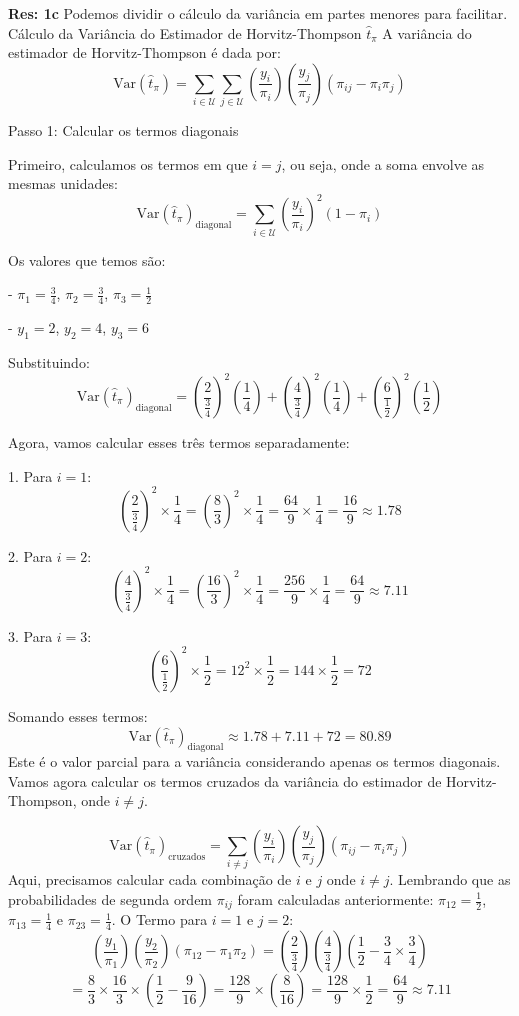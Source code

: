 \documentclass[a4paper,11pt,oneside,twocolumn]{Config/milktest}
\begin{document}
\medskip
{\scriptsize

\textbf{Res:  1c} Podemos dividir o cálculo da variância em partes menores para facilitar. Cálculo da Variância do Estimador de Horvitz-Thompson \(\hat{t}_\pi\) A variância do estimador de Horvitz-Thompson é dada por:
\[
\text{Var}(\hat{t}_\pi) = \sum_{i \in \mathcal{U}} \sum_{j \in \mathcal{U}} \left(\frac{y_i}{\pi_i}\right) \left(\frac{y_j}{\pi_j}\right) (\pi_{ij} - \pi_i \pi_j)
\]

Passo 1: Calcular os termos diagonais

Primeiro, calculamos os termos em que \(i = j\), ou seja, onde a soma envolve as mesmas unidades:
\[
\text{Var}(\hat{t}_\pi)_{\text{diagonal}} = \sum_{i \in \mathcal{U}} \left(\frac{y_i}{\pi_i}\right)^2 (1 - \pi_i)
\]

Os valores que temos são:

- \(\pi_1 = \frac{3}{4}\), \(\pi_2 = \frac{3}{4}\), \(\pi_3 = \frac{1}{2}\)

- \(y_1 = 2\), \(y_2 = 4\), \(y_3 = 6\)

Substituindo:
\[
\text{Var}(\hat{t}_\pi)_{\text{diagonal}} = \left(\frac{2}{\frac{3}{4}}\right)^2 \left(\frac{1}{4}\right) + \left(\frac{4}{\frac{3}{4}}\right)^2 \left(\frac{1}{4}\right) + \left(\frac{6}{\frac{1}{2}}\right)^2 \left(\frac{1}{2}\right)
\]

Agora, vamos calcular esses três termos separadamente:

1. Para \(i = 1\):
\[
\left(\frac{2}{\frac{3}{4}}\right)^2 \times \frac{1}{4} = \left(\frac{8}{3}\right)^2 \times \frac{1}{4} = \frac{64}{9} \times \frac{1}{4} = \frac{16}{9} \approx 1.78
\]

2. Para \(i = 2\):
\[
\left(\frac{4}{\frac{3}{4}}\right)^2 \times \frac{1}{4} = \left(\frac{16}{3}\right)^2 \times \frac{1}{4} = \frac{256}{9} \times \frac{1}{4} = \frac{64}{9} \approx 7.11
\]

3. Para \(i = 3\):
\[
\left(\frac{6}{\frac{1}{2}}\right)^2 \times \frac{1}{2} = 12^2 \times \frac{1}{2} = 144 \times \frac{1}{2} = 72
\]

Somando esses termos:
\[
\text{Var}(\hat{t}_\pi)_{\text{diagonal}} \approx 1.78 + 7.11 + 72 = 80.89
\]
Este é o valor parcial para a variância considerando apenas os termos diagonais. Vamos agora calcular os termos cruzados da variância do estimador de Horvitz-Thompson, onde \(i \neq j\).

\[
\text{Var}(\hat{t}_\pi)_{\text{cruzados}} = \sum_{i \neq j} \left(\frac{y_i}{\pi_i}\right) \left(\frac{y_j}{\pi_j}\right) (\pi_{ij} - \pi_i \pi_j)
\]
Aqui, precisamos calcular cada combinação de \(i\) e \(j\) onde \(i \neq j\). Lembrando que as probabilidades de segunda ordem \(\pi_{ij}\) foram calculadas anteriormente: \(\pi_{12} = \frac{1}{2}\), \(\pi_{13} = \frac{1}{4}\) e \(\pi_{23} = \frac{1}{4}\). O Termo para \(i = 1\) e \(j = 2\):
\[
\left(\frac{y_1}{\pi_1}\right) \left(\frac{y_2}{\pi_2}\right) (\pi_{12} - \pi_1 \pi_2) = \left(\frac{2}{\frac{3}{4}}\right) \left(\frac{4}{\frac{3}{4}}\right) \left(\frac{1}{2} - \frac{3}{4} \times \frac{3}{4}\right)
\]
\[
= \frac{8}{3} \times \frac{16}{3} \times \left(\frac{1}{2} - \frac{9}{16}\right) = \frac{128}{9} \times \left(\frac{8}{16}\right) = \frac{128}{9} \times \frac{1}{2} = \frac{64}{9} \approx 7.11
\]

}
\end{document}

